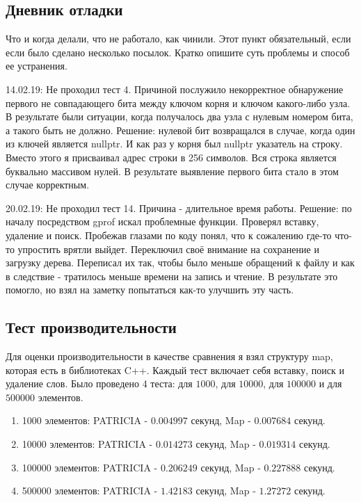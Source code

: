 \documentclass[12pt]{article}
\begin{document}
\subsection*{Дневник отладки}

Что и когда делали, что не работало, как чинили.
Этот пункт обязательный, если если было сделано несколько
посылок. Кратко опишите суть проблемы и способ ее устранения.

14.02.19: Не проходил тест 4. Причиной послужило некорректное обнаружение первого не совпадающего бита между ключом корня и ключом какого-либо узла. В результате были ситуации, когда получалось два узла с нулевым номером бита, а такого быть не должно. Решение: нулевой бит возвращался в случае, когда один из ключей является nullptr. И как раз у корня был nullptr указатель на строку. Вместо этого я присваивал адрес строки в 256 символов. Вся строка является буквально массивом нулей. В результате выявление первого бита стало в этом случае корректным.

20.02.19: Не проходил тест 14. Причина - длительное время работы. Решение: по началу посредством gprof искал проблемные функции. Проверял вставку, удаление и поиск. Пробежав глазами по коду понял, что к сожалению где-то что-то упростить врятли выйдет. Переключил своё внимание на сохранение и загрузку дерева. Переписал их так, чтобы было меньше обращений к файлу и как в следствие - тратилось меньше времени на запись и чтение. В результате это помогло, но взял на заметку попытаться как-то улучшить эту часть.

\subsection*{Тест производительности}

Для оценки производительности в качестве сравнения я взял структуру map, которая есть в библиотеках C++.
Каждый тест включает себя вставку, поиск и удаление слов.
Было проведено 4 теста: для $1000$, для $10000$, для $100000$ и для $500000$ элементов.
\begin{enumerate}
	\item 1000 элементов: PATRICIA - $0.004997$ секунд, Map - $0.007684$ секунд.
	\item 10000 элементов: PATRICIA - $0.014273$ секунд, Map - $0.019314$ секунд.
	\item 100000 элементов: PATRICIA - $0.206249$ секунд, Map - $0.227888$ секунд.
	\item 500000 элементов: PATRICIA - $1.42183$ секунд, Map - $1.27272$ секунд.
\end{enumerate}
	
\end{document}
